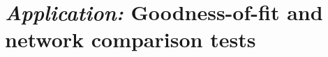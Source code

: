 \documentclass[8pt]{beamer}
\begin{document}
\section{{\sl Application:} Goodness-of-fit and network comparison tests}
% 
% 
%   
% 
%   
% 
\end{document}
